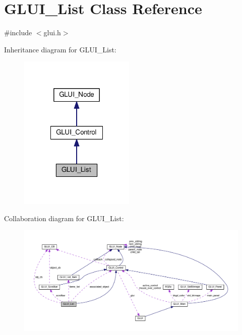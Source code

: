\hypertarget{class_g_l_u_i___list}{\section{G\+L\+U\+I\+\_\+\+List Class Reference}
\label{class_g_l_u_i___list}
}


{\ttfamily \#include $<$glui.\+h$>$}



Inheritance diagram for G\+L\+U\+I\+\_\+\+List\+:\nopagebreak
\begin{figure}[H]
\begin{center}
\leavevmode
\includegraphics[width=156pt]{class_g_l_u_i___list__inherit__graph}
\end{center}
\end{figure}


Collaboration diagram for G\+L\+U\+I\+\_\+\+List\+:\nopagebreak
\begin{figure}[H]
\begin{center}
\leavevmode
\includegraphics[width=350pt]{class_g_l_u_i___list__coll__graph}
\end{center}
\end{figure}
